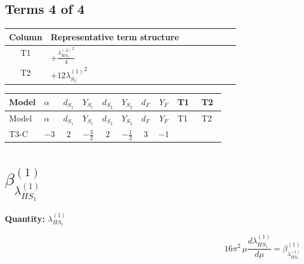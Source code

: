 \documentclass[8pt]{article}
\begin{document}
\begin{landscape}
\subsection*{Terms 4 of 4}
\begin{center}
\begin{tabular}{@{}c >{\raggedright\arraybackslash}p{0.82\linewidth}@{}}
\toprule
Column & Representative term structure \\
\midrule
T1 & \(\displaystyle +\frac{{\lambda_{HS_2}^{(A)}}^2}{4}\) \\
\midrule
T2 & \(\displaystyle +12 {\lambda_{S_2}^{(1)}}^2\) \\
\midrule
\bottomrule
\end{tabular}
\end{center}
\smallskip
\tiny
\begin{longtable}{@{}llcccccc >{\raggedright\arraybackslash}p{0.21\linewidth} >{\raggedright\arraybackslash}p{0.21\linewidth}@{}}
\toprule
Model & $\alpha$ & $d_{S_1}$ & $Y_{S_1}$ & $d_{S_2}$ & $Y_{S_2}$ & $d_F$ & $Y_F$ & T1 & T2 \\
\midrule
\endfirsthead
\toprule
Model & $\alpha$ & $d_{S_1}$ & $Y_{S_1}$ & $d_{S_2}$ & $Y_{S_2}$ & $d_F$ & $Y_F$ & T1 & T2 \\
\midrule
\endhead
T3-C & $-3$ & $2$ & $-\frac{3}{2}$ & $2$ & $-\frac{1}{2}$ & $3$ & $-1$ & \scriptsize\adjustbox{max width=\linewidth}{$\begin{gathered} +\frac{{\lambda_{HS_2}^{(A)}}^2}{4}\end{gathered}$} & \scriptsize\adjustbox{max width=\linewidth}{$\begin{gathered} +12 {\lambda_{S_2}^{(1)}}^2\end{gathered}$} \\
\midrule
\bottomrule
\end{longtable}
\clearpage
\section*{$\beta_{\lambda_{HS_1}^{(1)}}^{(1)}$}
\noindent\textbf{Quantity: }$\lambda_{HS_1}^{(1)}$\par\smallskip
\[16\pi^2\,\mu\frac{d \lambda_{HS_1}^{(1)}}{d\mu}=\beta_{\lambda_{HS_1}^{(1)}}^{(1)}\]

\end{landscape}
\end{document}
